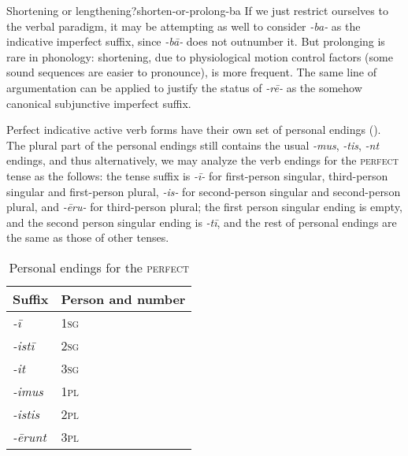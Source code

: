 \documentclass[a4paper, oneside]{report}
\newcommand{\form}[1]{\emph{#1}}
\newcommand*{\category}[1]{\textsc{#1}}
\begin{document}
\begin{infobox}{Shortening or lengthening?}{shorten-or-prolong-ba}
    If we just restrict ourselves to the verbal paradigm, 
    it may be attempting as well to consider \form{-ba-} as 
    the indicative imperfect suffix,
    since \form{-b\={a}-} does not outnumber it.
    But prolonging is rare in phonology:
    shortening, due to physiological motion control factors
    (some sound sequences are easier to pronounce), 
    is more frequent.
    The same line of argumentation can be applied to justify the status of \form{-r\={e}-}
    as the somehow canonical subjunctive imperfect suffix.
\end{infobox}

Perfect indicative active verb forms have their own set of personal endings
().
The plural part of the personal endings still contains 
the usual \form{-mus}, \form{-tis}, \form{-nt} endings, 
and thus alternatively, we may analyze the verb endings for the \category{perfect} tense 
as the follows: 
the tense suffix is \form{-ī-}
for first-person singular, third-person singular and first-person plural,
\form{-is-} for second-person singular and second-person plural,
and \form{-\={e}ru-} for third-person plural;
the first person singular ending is empty,
and the second person singular ending is \form{-tī},
and the rest of personal endings are the same as those of other tenses.

\begin{table}[H]
    \centering
    \caption{Personal endings for the \category{perfect}}
    \label{tbl:personal-ending-perfect}
    \begin{tabular}{ll}
        \toprule
        Suffix & Person and number \\
        \midrule
        \form{-ī    } & \category{1sg} \\
        \form{-istī } & \category{2sg} \\
        \form{-it   } & \category{3sg} \\
        \form{-imus } & \category{1pl} \\
        \form{-istis} & \category{2pl} \\
        \form{-\={e}runt} & \category{3pl} \\ 
        \bottomrule
    \end{tabular}
\end{table}
\end{document}
